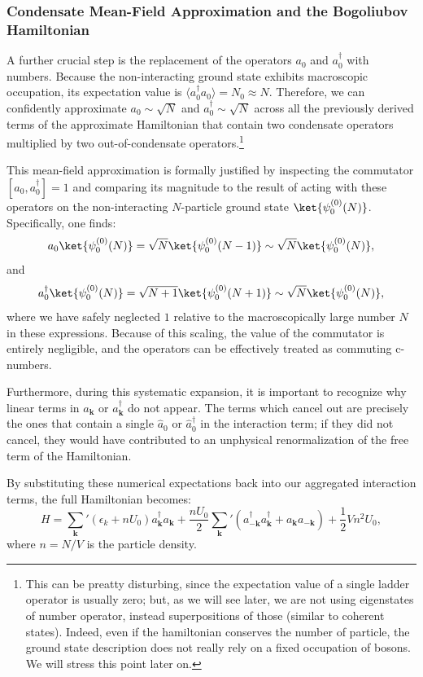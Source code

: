 \subsubsection{Condensate Mean-Field Approximation and the Bogoliubov Hamiltonian}

A further crucial step is the replacement of the operators \( a_0 \) and \( a_0^\dagger \) with numbers. Because the non-interacting ground state exhibits macroscopic occupation, its expectation value is \( \langle a_0^\dagger a_0 \rangle = N_0 \approx N \). Therefore, we can confidently approximate \( a_0 \sim \sqrt{N} \) and \( a_0^\dagger \sim \sqrt{N} \) across all the previously derived terms of the approximate Hamiltonian that contain two condensate operators multiplied by two out-of-condensate operators.\footnote{This can be preatty disturbing, since the expectation value of a single ladder operator is usually zero; but, as we will see later, we are not using eigenstates of number operator, instead superpositions of those (similar to coherent states). Indeed, even if the hamiltonian conserves the number of particle, the ground state description does not really rely on a fixed occupation of bosons. We will stress this point later on.}

This mean-field approximation is formally justified by inspecting the commutator \( [a_0, a_0^\dagger] = 1 \) and comparing its magnitude to the result of acting with these operators on the non-interacting \( N \)-particle ground state \( \ket{\psi_0^{(0)}(N)} \). Specifically, one finds:
\[
    a_0 \ket{\psi_0^{(0)}(N)} = \sqrt{N} \ket{\psi_0^{(0)}(N-1)} \sim \sqrt{N} \ket{\psi_0^{(0)}(N)},
\]
and
\[
    a_0^\dagger \ket{\psi_0^{(0)}(N)} = \sqrt{N+1} \ket{\psi_0^{(0)}(N+1)} \sim \sqrt{N} \ket{\psi_0^{(0)}(N)},
\]
where we have safely neglected \( 1 \) relative to the macroscopically large number \( N \) in these expressions. Because of this scaling, the value of the commutator is entirely negligible, and the operators can be effectively treated as commuting c-numbers.

Furthermore, during this systematic expansion, it is important to recognize why linear terms in \( a_{\mathbf{k}} \) or \( a_{\mathbf{k}}^\dagger \) do not appear. The terms which cancel out are precisely the ones that contain a single \( \hat{a}_0 \) or \( \hat{a}_0^\dagger \) in the interaction term; if they did not cancel, they would have contributed to an unphysical renormalization of the free term of the Hamiltonian.

By substituting these numerical expectations back into our aggregated interaction terms, the full Hamiltonian becomes:
\begin{equation} \label{eq:bogoliubov_hamiltonian}
    H = \sum_{\mathbf{k}}' (\epsilon_k + nU_0) a_{\mathbf{k}}^\dagger a_{\mathbf{k}} + \frac{nU_0}{2} \sum_{\mathbf{k}}' (a_{-\mathbf{k}}^\dagger a_{\mathbf{k}}^\dagger + a_{\mathbf{k}} a_{-\mathbf{k}}) + \frac{1}{2}V n^2 U_0,
\end{equation}
where \( n = N/V \) is the particle density.

